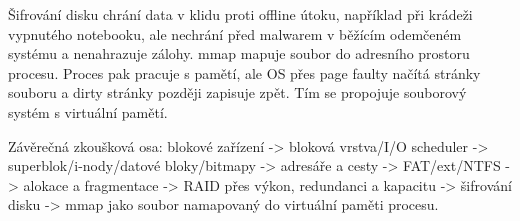 Šifrování disku chrání data v klidu proti offline útoku, například při krádeži vypnutého notebooku, ale nechrání před malwarem v běžícím odemčeném systému a nenahrazuje zálohy. mmap mapuje soubor do adresního prostoru procesu. Proces pak pracuje s pamětí, ale OS přes page faulty načítá stránky souboru a dirty stránky později zapisuje zpět. Tím se propojuje souborový systém s virtuální pamětí.

Závěrečná zkoušková osa: blokové zařízení -> bloková vrstva/I/O scheduler -> superblok/i-nody/datové bloky/bitmapy -> adresáře a cesty -> FAT/ext/NTFS -> alokace a fragmentace -> RAID přes výkon, redundanci a kapacitu -> šifrování disku -> mmap jako soubor namapovaný do virtuální paměti procesu.

\newpage

